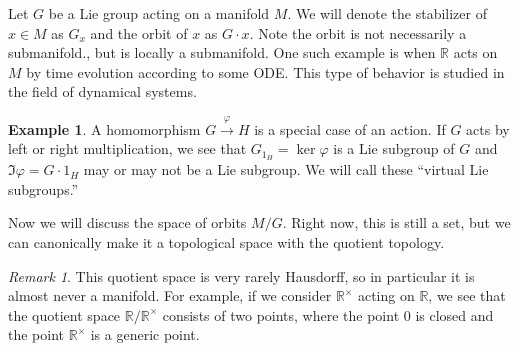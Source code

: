 \documentclass[leqno, openany]{memoir}
\theoremstyle{definition}
\newtheorem{exm}[thm]{Example}
\theoremstyle{remark}
\newtheorem{rmk}[thm]{Remark}
\theoremstyle{plain}
\theoremstyle{definition}
\theoremstyle{remark}
\newcommand{\R}{\mathbb{R}}
\begin{document}
Let $G$ be a Lie group acting on a manifold $M$. We will denote the stabilizer of $x \in M$ as $G_x$ and the orbit of $x$ as $G \cdot x$. Note the orbit is not necessarily a submanifold., but is locally a submanifold. One such example is when $\R$ acts on $M$ by time evolution according to some ODE. This type of behavior is studied in the field of dynamical systems.

\begin{exm}
    A homomorphism $G \xrightarrow{\varphi} H$ is a special case of an action. If $G$ acts by left or right multiplication, we see that $G_{1_H} = \ker \varphi$ is a Lie subgroup of $G$ and $\Im \varphi = G \cdot 1_H$ may or may not be a Lie subgroup. We will call these ``virtual Lie subgroups.''
\end{exm}

Now we will discuss the space of orbits $M / G$. Right now, this is still a set, but we can canonically make it a topological space with the quotient topology.

\begin{rmk}
    This quotient space is very rarely Hausdorff, so in particular it is almost never a manifold. For example, if we consider $\R^{\times}$ acting on $\R$, we see that the quotient space $\R / \R^{\times}$ consists of two points, where the point $0$ is closed and the point $\R^{\times}$ is a generic point.
\end{rmk}
\end{document}
